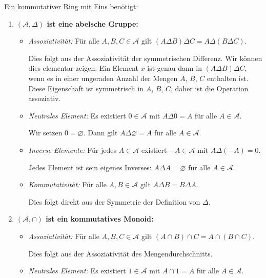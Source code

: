 \documentclass{article}
\renewcommand{\AA}{\mathcal{A}}
\theoremstyle{definition}
\begin{document}
Ein kommutativer Ring mit Eins benötigt:

\begin{enumerate}
    \item \textbf{$(\AA, \Delta)$ ist eine abelsche Gruppe:}
    \begin{itemize}
        \item \textit{Assoziativität:} Für alle $A, B, C \in \AA$ gilt $(A \Delta B) \Delta C = A \Delta (B \Delta C)$.
        
        Dies folgt aus der Assoziativität der symmetrischen Differenz. Wir können dies elementar zeigen: Ein Element $x$ ist genau dann in $(A \Delta B) \Delta C$, wenn es in einer ungeraden Anzahl der Mengen $A$, $B$, $C$ enthalten ist. Diese Eigenschaft ist symmetrisch in $A$, $B$, $C$, daher ist die Operation assoziativ.
        
        \item \textit{Neutrales Element:} Es existiert $0 \in \AA$ mit $A \Delta 0 = A$ für alle $A \in \AA$.
        
        Wir setzen $0 = \varnothing$. Dann gilt $A \Delta \varnothing = A$ für alle $A \in \AA$.
        
        \item \textit{Inverse Elemente:} Für jedes $A \in \AA$ existiert $-A \in \AA$ mit $A \Delta (-A) = 0$.
        
        Jedes Element ist sein eigenes Inverses: $A \Delta A = \varnothing$ für alle $A \in \AA$.
        
        \item \textit{Kommutativität:} Für alle $A, B \in \AA$ gilt $A \Delta B = B \Delta A$.
        
        Dies folgt direkt aus der Symmetrie der Definition von $\Delta$.
    \end{itemize}
    
    \item \textbf{$(\AA, \cap)$ ist ein kommutatives Monoid:}
    \begin{itemize}
        \item \textit{Assoziativität:} Für alle $A, B, C \in \AA$ gilt $(A \cap B) \cap C = A \cap (B \cap C)$.
        
        Dies folgt aus der Assoziativität des Mengendurchschnitts.
        
        \item \textit{Neutrales Element:} Es existiert $1 \in \AA$ mit $A \cap 1 = A$ für alle $A \in \AA$.
        

\end{itemize}
\end{enumerate}
\end{document}
